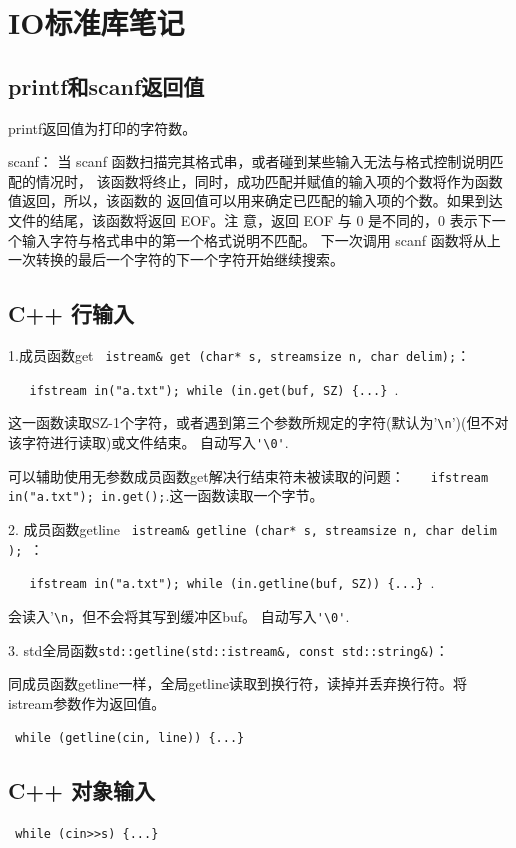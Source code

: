 
\section{IO标准库笔记}

\subsection{printf和scanf返回值}
printf返回值为打印的字符数。

scanf：
当 scanf 函数扫描完其格式串，或者碰到某些输入无法与格式控制说明匹配的情况时，
该函数将终止，同时，成功匹配并赋值的输入项的个数将作为函数值返回，所以，该函数的
返回值可以用来确定已匹配的输入项的个数。如果到达文件的结尾，该函数将返回 EOF。注
意，返回 EOF 与 0 是不同的，0 表示下一个输入字符与格式串中的第一个格式说明不匹配。
下一次调用 scanf 函数将从上一次转换的最后一个字符的下一个字符开始继续搜索。

\subsection{C++ 行输入}
1.成员函数get \verb$ istream& get (char* s, streamsize n, char delim);$：

\verb$   ifstream in("a.txt"); while (in.get(buf, SZ) {...} $.

这一函数读取SZ-1个字符，或者遇到第三个参数所规定的字符(默认为'\verb$\n$')(但不对该字符进行读取)或文件结束。
自动写入\verb$'\0'$.

可以辅助使用无参数成员函数get解决行结束符未被读取的问题：
\verb$   ifstream in("a.txt"); in.get();$.这一函数读取一个字节。

2. 成员函数getline \verb$ istream& getline (char* s, streamsize n, char delim ); $：

\verb$   ifstream in("a.txt"); while (in.getline(buf, SZ)) {...} $.

会读入'\verb$\n$，但不会将其写到缓冲区buf。
自动写入\verb$'\0'$.

3. std全局函数\verb$std::getline(std::istream&, const std::string&)$：

同成员函数getline一样，全局getline读取到换行符，读掉并丢弃换行符。将istream参数作为返回值。

\verb$ while (getline(cin, line)) {...} $

\subsection{C++ 对象输入}
\verb$ while (cin>>s) {...} $

